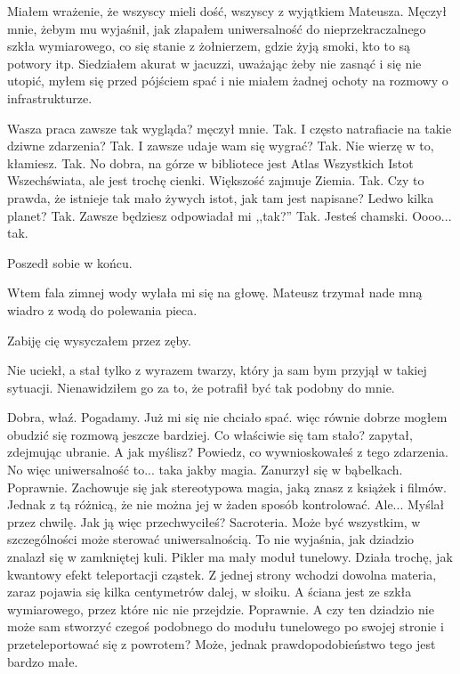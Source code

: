 Miałem wrażenie, że wszyscy mieli dość, wszyscy z wyjątkiem Mateusza.
Męczył mnie, żebym mu wyjaśnił, jak złapałem uniwersalność do nieprzekraczalnego szkła wymiarowego,
co się stanie z żołnierzem, gdzie żyją smoki, kto to są potwory itp.
Siedziałem akurat w jacuzzi, uważając żeby nie zasnąć i się nie utopić, myłem się przed pójściem spać i nie miałem żadnej ochoty na rozmowy o infrastrukturze.
\begin{dialogue}
\ds{} Wasza praca zawsze tak wygląda? \dm{} męczył mnie.
\ds{} Tak.
\ds{} I często natrafiacie na takie dziwne zdarzenia?
\ds{} Tak.
\ds{} I zawsze udaje wam się wygrać?
\ds{} Tak.
\ds{} Nie wierzę w to, kłamiesz.
\ds{} Tak.
\ds{} No dobra, na górze w bibliotece jest Atlas Wszystkich Istot Wszechświata, ale jest trochę cienki. Większość zajmuje Ziemia.
\ds{} Tak.
\ds{} Czy to prawda, że istnieje tak mało żywych istot, jak tam jest napisane? Ledwo kilka planet?
\ds{} Tak.
\ds{} Zawsze będziesz odpowiadał mi ,,tak?''
\ds{} Tak.
\ds{} Jesteś chamski.
\ds{} Oooo... tak.
\end{dialogue}
Poszedł sobie w końcu.

Wtem fala zimnej wody wylała mi się na głowę. 
Mateusz trzymał nade mną wiadro z wodą do polewania pieca.
\begin{dialogue}
\ds{} Zabiję cię \dm{} wysyczałem przez zęby.
\end{dialogue}
Nie uciekł, a stał tylko z wyrazem twarzy, który ja sam bym przyjął w takiej sytuacji.
Nienawidziłem go za to, że potrafił być tak podobny do mnie.
\begin{dialogue}
\ds{} Dobra, właź. Pogadamy. \dm{} Już mi się nie chciało spać. więc równie dobrze mogłem obudzić się rozmową jeszcze bardziej.
\ds{} Co właściwie się tam stało? \dm{} zapytał, zdejmując ubranie.
\ds{} A jak myślisz? Powiedz, co wywnioskowałeś z tego zdarzenia.
\ds{} No więc uniwersalność to... taka jakby magia. \dm{} Zanurzył się w bąbelkach.
\ds{} Poprawnie. Zachowuje się jak stereotypowa magia, jaką znasz z książek i filmów. Jednak z tą różnicą, że nie można jej w żaden sposób kontrolować.
\ds{} Ale... \dm{} Myślał przez chwilę. \dm{} Jak ją więc przechwyciłeś?
\ds{} Sacroteria. Może być wszystkim, w szczególności może sterować uniwersalnością.
\ds{} To nie wyjaśnia, jak dziadzio znalazł się w zamkniętej kuli.
\ds{} Pikler ma mały moduł tunelowy. Działa trochę, jak kwantowy efekt teleportacji cząstek. Z jednej strony wchodzi dowolna materia, zaraz pojawia się kilka centymetrów dalej, w słoiku.
\ds{} A ściana jest ze szkła wymiarowego, przez które nic nie przejdzie.
\ds{} Poprawnie.
\ds{} A czy ten dziadzio nie może sam stworzyć czegoś podobnego do modułu tunelowego po swojej stronie i przeteleportować się z powrotem?
\ds{} Może, jednak prawdopodobieństwo tego jest bardzo małe.
\end{dialogue}

